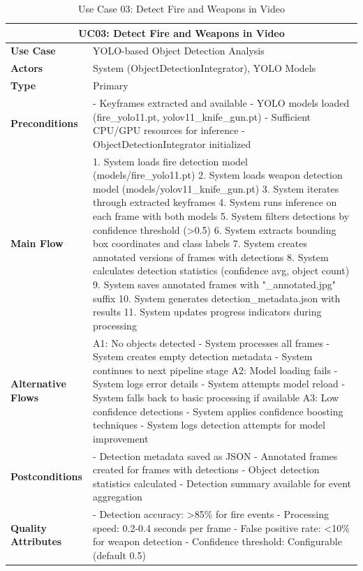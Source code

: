 \documentclass{article}
\begin{document}
\begin{table}[H]
\centering
\begin{tabularx}{\textwidth}{|l|X|}
\hline
\multicolumn{2}{|c|}{\textbf{UC03: Detect Fire and Weapons in Video}} \\ \hline
\textbf{Use Case} & YOLO-based Object Detection Analysis \\ \hline
\textbf{Actors} & System (ObjectDetectionIntegrator), YOLO Models \\ \hline
\textbf{Type} & Primary \\ \hline
\textbf{Preconditions} & 
- Keyframes extracted and available
- YOLO models loaded (fire\_yolo11.pt, yolov11\_knife\_gun.pt)
- Sufficient CPU/GPU resources for inference
- ObjectDetectionIntegrator initialized \\ \hline
\textbf{Main Flow} & 
1. System loads fire detection model (models/fire\_yolo11.pt)
2. System loads weapon detection model (models/yolov11\_knife\_gun.pt)
3. System iterates through extracted keyframes
4. System runs inference on each frame with both models
5. System filters detections by confidence threshold (>0.5)
6. System extracts bounding box coordinates and class labels
7. System creates annotated versions of frames with detections
8. System calculates detection statistics (confidence avg, object count)
9. System saves annotated frames with "\_annotated.jpg" suffix
10. System generates detection\_metadata.json with results
11. System updates progress indicators during processing \\ \hline
\textbf{Alternative Flows} & 
A1: No objects detected
- System processes all frames
- System creates empty detection metadata
- System continues to next pipeline stage
A2: Model loading fails
- System logs error details
- System attempts model reload
- System falls back to basic processing if available
A3: Low confidence detections
- System applies confidence boosting techniques
- System logs detection attempts for model improvement \\ \hline
\textbf{Postconditions} & 
- Detection metadata saved as JSON
- Annotated frames created for frames with detections
- Object detection statistics calculated
- Detection summary available for event aggregation \\ \hline
\textbf{Quality Attributes} & 
- Detection accuracy: >85\% for fire events
- Processing speed: 0.2-0.4 seconds per frame
- False positive rate: <10\% for weapon detection
- Confidence threshold: Configurable (default 0.5) \\ \hline
\end{tabularx}
\caption{Use Case 03: Detect Fire and Weapons in Video}
\end{table}
\end{document}
